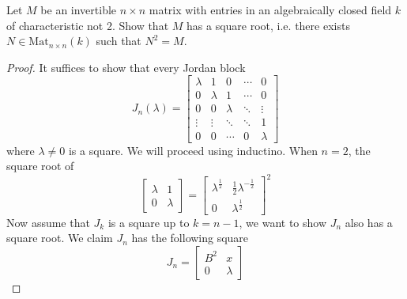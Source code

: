 \begin{prob}[S2017-Q4]
    Let \(M\) be an invertible \(n\times n\) matrix with entries in an algebraically closed field \(k\) of characteristic not 2. Show that \(M\) has a square root, i.e. there exists \(N\in\text{Mat}_{n\times n}(k)\) such that \(N^{2}=M\).
\end{prob}
\begin{proof}
    It suffices to show that every Jordan block 
    \[
        J_n(\lambda) = 
        \begin{bmatrix}
        \lambda & 1       & 0       & \cdots & 0 \\
        0       & \lambda & 1       & \cdots & 0 \\
        0       & 0       & \lambda & \ddots & \vdots \\
        \vdots  & \vdots  & \ddots  & \ddots & 1 \\
        0       & 0       & \cdots  & 0      & \lambda
        \end{bmatrix}
        \]
        where $\lambda\neq 0$ is a square. We will proceed using inductino. When $n=2$, the square root of 
        \begin{equation*}
            \begin{bmatrix}
                \lambda&1\\
                0&\lambda
            \end{bmatrix}=\begin{bmatrix}
                \lambda^\frac{1}{2}&\frac{1}{2}\lambda^{-\frac{1}{2}}\\
                0&\lambda^\frac{1}{2}
            \end{bmatrix}^2
        \end{equation*} 
        Now assume that $J_{k}$ is a square up to $k=n-1$, we want to show $J_n$ also has a square root. We claim $J_n$ has the following square 
        \begin{equation*}
            J_n=\begin{bmatrix}
                B^2&x\\
                0&\lambda


\end{bmatrix}
\end{equation*}
\end{proof}
